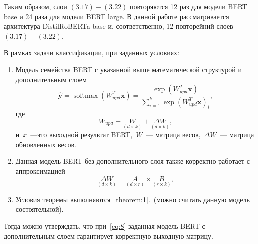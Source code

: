 Таким образом, слои $(3.17) - (3.22)$ повторяются 12 раз для модели BERT base и 24 раза для модели BERT large. В данной работе рассматривается архитектура DistilRoBERTa base и, соответственно, 12 повторейний слоев $(3.17) - (3.22)$.


\begin{theorem}
В рамках задачи классификации, при заданных условиях:
\begin{enumerate}
    \item Модель семейства BERT с указанной выше математической структурой и дополнительным слоем 
    \begin{equation}
    \label{eq:6}
        \hat{\mathbf{y}}=\operatorname{softmax}\left(W_{upd}^T \mathbf{x}\right)=\frac{\exp \left(W_{upd}^T \mathbf{x}\right)}{\sum_{i=1}^k \exp \left(W_{upd}^T \mathbf{x}\right)_i},
    \end{equation}
    где 
    \begin{equation}
    \label{eq:7}
    W_{upd} =\underset{(d \times k) }{W} + \underset{(d \times k)}{\Delta W},
    \end{equation}
    и~$x$~---это выходной результат BERT,~$W$~--- матрица весов,~$\Delta W$~--- матрица обновленных весов.
    \item  Данная модель BERT без дополнительного слоя также корректно работает с аппроксимацией 
    \begin{equation}
    \label{eq:8}
    \underset{(d \times k)}{\Delta W} = \underset{(d \times r)}{ A} \times \underset{(r \times k)}{B},
    \end{equation}
    \item Условия теоремы выполняются~\ref{theorem:1}.~(можно считать данную модель состоятельной).
\end{enumerate}
Тогда можно утверждать, что при~\eqref{eq:8} заданная модель BERT с дополнительным слоем гарантирует корректную выходную матрицу.
\end{theorem}
\renewcommand\qedsymbol{$\blacksquare$}
